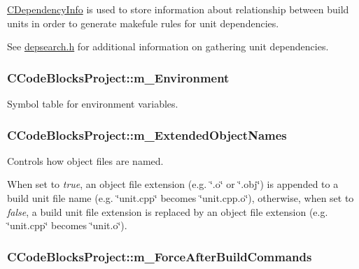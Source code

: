 \hyperlink{classCDependencyInfo}{C\-Dependency\-Info} is used to store information about relationship between build units in order to generate makefule rules for unit dependencies.

See \hyperlink{depsearch_8h}{depsearch.\-h} for additional information on gathering unit dependencies. \hypertarget{classCCodeBlocksProject_a2abc20327d98c940a5a6315e2b6278cf}{
\subsubsection[{m\-\_\-\-Environment}]{\setlength{\rightskip}{0pt plus 5cm}C\-Code\-Blocks\-Project\-::m\-\_\-\-Environment\hspace{0.3cm}{\ttfamily [private]}}}\label{classCCodeBlocksProject_a2abc20327d98c940a5a6315e2b6278cf}


Symbol table for environment variables. 

\hypertarget{classCCodeBlocksProject_a7c318cc658b910db00e35e4b835a3246}{
\subsubsection[{m\-\_\-\-Extended\-Object\-Names}]{\setlength{\rightskip}{0pt plus 5cm}C\-Code\-Blocks\-Project\-::m\-\_\-\-Extended\-Object\-Names\hspace{0.3cm}{\ttfamily [private]}}}\label{classCCodeBlocksProject_a7c318cc658b910db00e35e4b835a3246}


Controls how object files are named. 

When set to {\itshape true}, an object file extension (e.\-g. \char`\"{}.\-o\char`\"{} or \char`\"{}.\-obj\char`\"{}) is appended to a build unit file name (e.\-g. \char`\"{}unit.\-cpp\char`\"{} becomes \char`\"{}unit.\-cpp.\-o\char`\"{}), otherwise, when set to {\itshape false}, a build unit file extension is replaced by an object file extension (e.\-g. \char`\"{}unit.\-cpp\char`\"{} becomes \char`\"{}unit.\-o\char`\"{}). \hypertarget{classCCodeBlocksProject_aab5e897056f92e3c44fffa1e1d433def}{
\subsubsection[{m\-\_\-\-Force\-After\-Build\-Commands}]{\setlength{\rightskip}{0pt plus 5cm}C\-Code\-Blocks\-Project\-::m\-\_\-\-Force\-After\-Build\-Commands\hspace{0.3cm}{\ttfamily [private]}}}\label{classCCodeBlocksProject_aab5e897056f92e3c44fffa1e1d433def}


